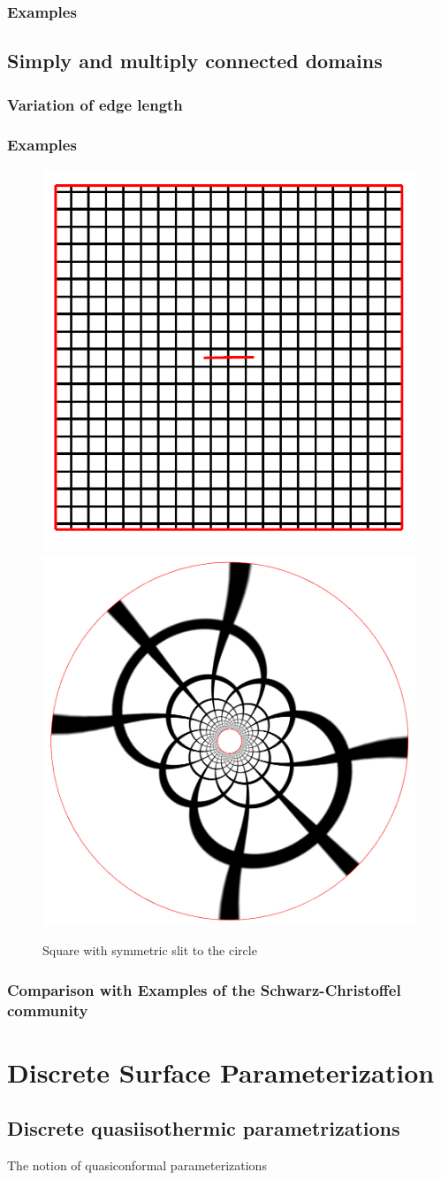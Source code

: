\documentclass{book}
\begin{document}
\subsection{Examples}

\section{Simply and multiply connected domains}
\label{sec:planar_domains}
\subsection{Variation of edge length}
\subsection{Examples}
\begin{figure}
	\centering
	\includegraphics[width=0.3\linewidth]{image/slit_domain/domain_grid.png}
	\includegraphics[width=0.3\linewidth]{image/slit_domain/image_grid.png}
	\caption{Square with symmetric slit to the circle}
	\label{fig:slit_circle}
\end{figure}

\subsection{Comparison with Examples of the Schwarz-Christoffel community}

\chapter{Discrete Surface Parameterization}


\section{Discrete quasiisothermic parametrizations}
The notion of quasiconformal parameterizations
\end{document}

